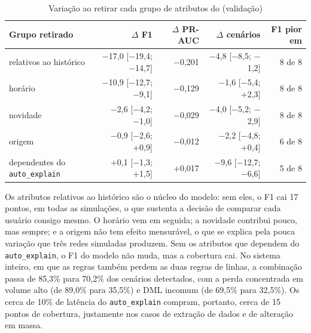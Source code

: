 \begin{table}[htb]
    \centering
    \ABNTEXfontereduzida
    \setlength{\tabcolsep}{4pt}
    \begin{minipage}{\textwidth}
        \caption{\label{tab:ablacao}Variação ao retirar cada grupo de atributos do \iforest{}
        (validação)}
        \begin{tabular*}{\textwidth}{@{\extracolsep{\fill}}lrrrr}
            \toprule
            \textbf{Grupo retirado} & \textbf{$\Delta$ F1} & \textbf{$\Delta$ PR-AUC} &
            \textbf{$\Delta$ cenários} & \textbf{F1 pior em} \\
            \midrule
            relativos ao histórico & $-$17,0 [$-$19,4; $-$14,7] & $-$0,201 & $-$4,8 [$-$8,5; $-$1,2] & 8 de 8 \\
            horário                & $-$10,9 [$-$12,7; $-$9,1]  & $-$0,129 & $-$1,6 [$-$5,4; +2,3]  & 8 de 8 \\
            novidade               & $-$2,6 [$-$4,2; $-$1,0]    & $-$0,029 & $-$4,0 [$-$5,2; $-$2,9] & 8 de 8 \\
            origem                 & $-$0,9 [$-$2,6; +0,9]      & $-$0,012 & $-$2,2 [$-$4,8; +0,4]  & 6 de 8 \\
            dependentes do \texttt{auto\_explain} & +0,1 [$-$1,3; +1,5] & +0,017 & $-$9,6 [$-$12,7; $-$6,6] & 5 de 8 \\
            \bottomrule
        \end{tabular*}
    \end{minipage}
\end{table}

Os atributos relativos ao histórico são o núcleo do modelo: sem eles, o F1 cai 17 pontos, em
todas as simulações, o que sustenta a decisão de comparar cada usuário consigo mesmo. O horário
vem em seguida; a novidade contribui pouco, mas sempre; e a origem não tem efeito mensurável, o
que se explica pela pouca variação que três redes simuladas produzem. Sem os atributos que
dependem do \texttt{auto\_explain}, o F1 do modelo não muda, mas a cobertura cai. No sistema
inteiro, em que as regras também perdem as duas regras de linhas, a combinação passa de 85,3\%
para 70,2\% dos cenários detectados, com a perda concentrada em volume alto (de 89,0\% para
35,5\%) e DML incomum (de 69,5\% para 32,5\%). Os cerca de 10\% de latência do
\texttt{auto\_explain} compram, portanto, cerca de 15 pontos de cobertura, justamente nos casos
de extração de dados e de alteração em massa.

